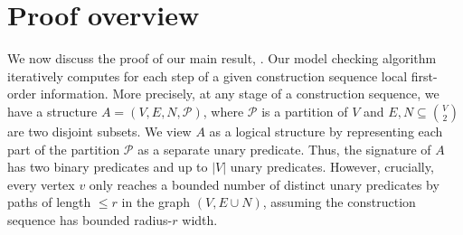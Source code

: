 \documentclass[11pt]{article}
\theoremstyle{remark}
\def\cal{\mathcal}
\def\N{\mathbb N}
\renewcommand{\subset}{\subseteq}
\renewcommand{\le}{\leqslant}
\begin{document}


\section{Proof overview}\label{sec:overview}
We now discuss the proof of our main result, .
Our model checking algorithm iteratively computes for each step of a given construction sequence local first-order information.
More precisely,
at any stage of a construction sequence,
we have a structure $A=(V,E,N,\cal P)$,
where $\cal P$ is a partition of $V$ and $E,N\subset {V\choose 2}$ are two disjoint subsets.
We view $A$ as a logical structure by representing each part of the partition $\cal P$ as a separate unary predicate. Thus, the signature of $A$ has two binary predicates and up to $|V|$ unary predicates. However, crucially, every vertex $v$ only reaches a bounded number of distinct unary predicates by paths of length ${\le}r$ in the graph $(V,E\cup N)$, assuming the construction sequence has bounded radius-$r$ width.
\end{document}
